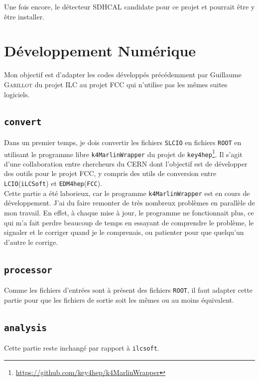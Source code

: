 \documentclass[10pt,a4paper]{report}
\newcommand{\ROOT}{\texttt{ROOT}\xspace}
\newcommand{\SLCIO}{\texttt{SLCIO}\xspace}
\newcommand{\iLCSoft}{\texttt{iLCSoft}\xspace}
\newcommand{\LCIO}{\texttt{LCIO}\xspace}
\newcommand{\FCC}{\texttt{FCC}\xspace}
\newcommand{\EDMhep}{\texttt{EDM4hep}\xspace}
\newcommand{\ilcsoft}{\texttt{ilcsoft}\xspace}
\newcommand{\convert}{\texttt{convert}\xspace}
\newcommand{\processor}{\texttt{processor}\xspace}
\newcommand{\analysis}{\texttt{analysis}\xspace}
\begin{document}
Une fois encore, le détecteur SDHCAL candidate pour ce projet et pourrait être y être installer.

\section{Développement Numérique}

Mon objectif est d'adapter les codes développés précédemment par Guillaume 
\textsc{Garillot} du projet ILC au projet FCC qui n'utilise pas les mêmes suites logiciels.\\


\subsection{\convert}

Dans un premier temps, je dois convertir les fichiers \SLCIO en fichiers \ROOT en utilisant le programme libre \texttt{k4MarlinWrapper} du projet de \texttt{key4hep}\footnote{\url{https://github.com/key4hep/k4MarlinWrapper}}. 
Il s'agit d'une collaboration entre chercheurs du CERN dont l'objectif est de développer des outils pour le projet FCC, y compris des utils de conversion entre \LCIO (\iLCSoft) et \EDMhep (\FCC).%
\\

Cette partie a été laborieux, car le programme \texttt{k4MarlinWrapper} est en cours de développement. 
J'ai du faire remonter de très nombreux problèmes en parallèle de mon travail. 
En effet, à chaque mise à jour, le programme ne fonctionnait plus, ce qui m'a fait perdre beaucoup de temps en essayant de comprendre le problème, le signaler et le corriger quand je le comprenais, ou patienter pour que quelqu'un d'autre le corrige. 

\subsection{\processor}

Comme les fichiers d'entrées sont à présent des fichiers \ROOT, il faut adapter cette partie pour que les fichiers de sortie soit les mêmes ou au moins équivalent.

\subsection{\analysis}

Cette partie reste inchangé par rapport à \ilcsoft.
\end{document}
